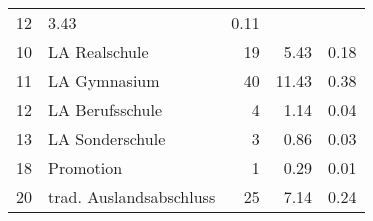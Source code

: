 \begin{longtable}{lXrrr}
       \num{12} &
       \num[round-mode=places,round-precision=2]{3.43} &
         \num[round-mode=places,round-precision=2]{0.11} \\

     10 &
     \multicolumn{1}{X}{ LA Realschule   } &


       \num{19} &
       \num[round-mode=places,round-precision=2]{5.43} &
         \num[round-mode=places,round-precision=2]{0.18} \\

     11 &
     \multicolumn{1}{X}{ LA Gymnasium   } &


       \num{40} &
       \num[round-mode=places,round-precision=2]{11.43} &
         \num[round-mode=places,round-precision=2]{0.38} \\

     12 &
     \multicolumn{1}{X}{ LA Berufsschule   } &


       \num{4} &
       \num[round-mode=places,round-precision=2]{1.14} &
         \num[round-mode=places,round-precision=2]{0.04} \\

     13 &
     \multicolumn{1}{X}{ LA Sonderschule   } &


       \num{3} &
       \num[round-mode=places,round-precision=2]{0.86} &
         \num[round-mode=places,round-precision=2]{0.03} \\

     18 &
     \multicolumn{1}{X}{ Promotion   } &


       \num{1} &
       \num[round-mode=places,round-precision=2]{0.29} &
         \num[round-mode=places,round-precision=2]{0.01} \\

     20 &
     \multicolumn{1}{X}{ trad. Auslandsabschluss   } &


       \num{25} &
       \num[round-mode=places,round-precision=2]{7.14} &
         \num[round-mode=places,round-precision=2]{0.24} \\


\end{longtable}
